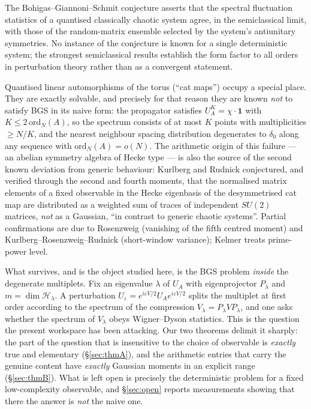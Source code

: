 \documentclass[11pt,reqno]{amsart}
\theoremstyle{definition}
\newcommand{\HH}{\mathcal{H}}
\begin{document}
The Bohigas--Giannoni--Schmit conjecture \cite{BGS1984} asserts that the
spectral fluctuation statistics of a quantised classically chaotic system agree,
in the semiclassical limit, with those of the random-matrix ensemble selected by
the system's antiunitary symmetries. No instance of the conjecture is known for
a single deterministic system; the strongest semiclassical results establish the
form factor to all orders in perturbation theory
\cite{SieberRichter2001,Mueller2004} rather than as a convergent statement.

Quantised linear automorphisms of the torus (``cat maps'') occupy a special
place. They are exactly solvable, and precisely for that reason they are known
\emph{not} to satisfy BGS in its naive form: the propagator satisfies
$U_A^{K}=\chi\cdot\mathbf 1$ with $K\le 2\,\mathrm{ord}_N(A)$, so the spectrum
consists of at most $K$ points with multiplicities $\ge N/K$, and the nearest
neighbour spacing distribution degenerates to $\delta_0$ along any sequence with
$\mathrm{ord}_N(A)=o(N)$. The arithmetic origin of this failure --- an
abelian symmetry algebra of Hecke type --- is also the source of the second
known deviation from generic behaviour: Kurlberg and Rudnick
\cite{KurlbergRudnick2005} conjectured, and verified through the second and
fourth moments, that the normalised matrix elements of a fixed observable in the
Hecke eigenbasis of the desymmetrised cat map are distributed as a weighted sum
of traces of independent $SU(2)$ matrices, \emph{not} as a Gaussian, ``in
contrast to generic chaotic systems''. Partial confirmations are due to
Rosenzweig \cite{Rosenzweig2009} (vanishing of the fifth centred moment) and
Kurlberg--Rosenzweig--Rudnick \cite{KRR2007} (short-window variance); Kelmer
\cite{Kelmer2008} treats prime-power level.

What survives, and is the object studied here, is the BGS problem \emph{inside}
the degenerate multiplets. Fix an eigenvalue $\lambda$ of $U_A$ with
eigenprojector $P_\lambda$ and $m=\dim\HH_\lambda$. A perturbation
$U_\varepsilon=e^{i\varepsilon V/2}U_Ae^{i\varepsilon V/2}$ splits the multiplet
at first order according to the spectrum of the compression
$V_\lambda=P_\lambda VP_\lambda$, and one asks whether the spectrum of
$V_\lambda$ obeys Wigner--Dyson statistics. This is the question the present
workspace has been attacking. Our two theorems delimit it sharply: the part of
the question that is insensitive to the choice of observable is \emph{exactly}
true and elementary (\S\ref{sec:thmA}), and the arithmetic entries that carry
the genuine content have \emph{exactly} Gaussian moments in an explicit range
(\S\ref{sec:thmB}). What is left open is precisely the deterministic problem for
a fixed low-complexity observable, and \S\ref{sec:open} reports measurements
showing that there the answer is \emph{not} the naive one.
\end{document}
